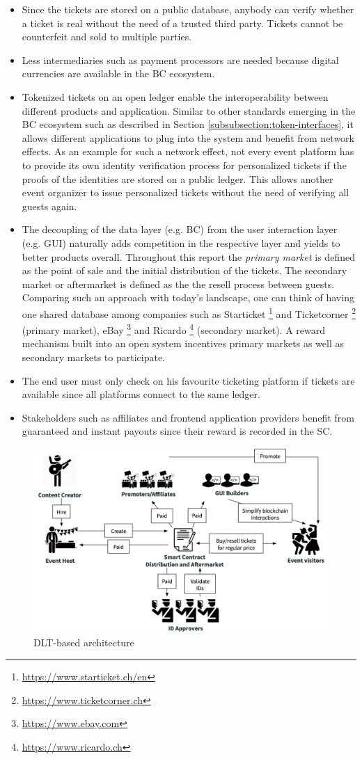 \begin{itemize}
	\item Since the tickets are stored on a public database, anybody can verify whether a ticket is real without the need of a trusted third party. Tickets cannot be counterfeit and sold to multiple parties. 
	\item Less intermediaries such as payment processors are needed because digital currencies are available in the BC ecosystem. 
	\item Tokenized tickets on an open ledger enable the interoperability between different products and application. Similar to other standards emerging in the BC ecosystem such as described in Section \ref{subsubsection:token-interfaces}, it allows different applications to plug into the system and benefit from network effects. As an example for such a network effect, not every event platform has to provide its own identity verification process for personalized tickets if the proofs of the identities are stored on a public ledger. This allows another event organizer to issue personalized tickets without the need of verifying all guests again.
	\item The decoupling of the data layer (e.g. BC) from the user interaction layer (e.g. GUI) naturally adds competition in the respective layer and yields to better products overall. Throughout this report the \textit{primary market} is defined as the point of sale and the initial distribution of the tickets. The secondary market or aftermarket is defined as the the resell process between guests. Comparing such an approach with today's landscape, one can think of having one shared database among companies such as Starticket \footnote{\url{https://www.starticket.ch/en}} and Ticketcorner \footnote{\url{https://www.ticketcorner.ch}} (primary market), eBay \footnote{\url{https://www.ebay.com}} and Ricardo \footnote{\url{https://www.ricardo.ch}} (secondary market). A reward mechanism built into an open system incentives primary markets as well as secondary markets to participate. 
	\item The end user must only check on his favourite ticketing platform if tickets are available since all platforms connect to the same ledger.
	\item Stakeholders such as affiliates and frontend application providers benefit from guaranteed and instant payouts since their reward is recorded in the SC. 
\end{itemize}

\begin{figure}[H]
    \centering
    \includegraphics[width=16cm]{figures/dlt-based-landscape.png}
    \caption{DLT-based architecture}
    \label{fig:dlt-based-landscape1}
\end{figure}
